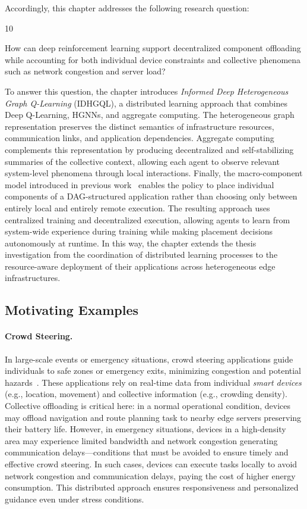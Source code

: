 Accordingly, this chapter addresses the following research question:

\begin{chapRQ}{10}
  \item
  How can deep reinforcement learning support decentralized component offloading while accounting
  for both individual device constraints and collective phenomena such as network congestion and server load?
  \label{idhgql-rq}
\end{chapRQ}

To answer this question, 
 the chapter introduces \emph{Informed Deep Heterogeneous Graph Q-Learning} (IDHGQL), 
 a distributed learning approach that combines Deep Q-Learning, \glspl{HGNN}, and aggregate computing.
%
The heterogeneous graph representation preserves the distinct semantics of infrastructure resources, 
 communication links, and application dependencies.
%
Aggregate computing complements this representation by producing decentralized and self-stabilizing summaries 
 of the collective context, allowing each agent to observe relevant system-level phenomena through local interactions.
%
Finally, 
 the macro-component model introduced in previous work~\cite{acsos-model} enables the policy to place individual components 
  of a DAG-structured application rather than choosing only between entirely local and entirely remote execution.
%
The resulting approach uses centralized training and decentralized execution, 
 allowing agents to learn from system-wide experience during training
 while making placement decisions autonomously at runtime.
%
In this way, 
 the chapter extends the thesis investigation from the coordination of distributed learning processes 
 to the resource-aware deployment of their applications across heterogeneous edge infrastructures.

\subsection{Motivating Examples}\label{subsec:offloading-motivating-examples}
\paragraph{Crowd Steering.}
In large-scale events or emergency situations, 
 crowd steering applications guide individuals to safe zones or emergency exits, 
 minimizing congestion and potential hazards~\cite{DBLP:conf/IEEEcit/SassiBGMMZ15}.
%
These applications rely on real-time data from individual \emph{smart devices} 
 (e.g., location, movement) and collective information (e.g., crowding density).
%
Collective offloading is critical here: in a normal operational condition,
 devices may offload navigation and route planning task to nearby edge servers preserving their battery life.
%
However, in emergency situations,
 devices in a high-density area 
 may experience limited bandwidth and network congestion generating communication delays---conditions 
 that must be avoided to ensure timely and effective crowd steering.
%
In such cases,
 devices can execute tasks locally to avoid network congestion and communication delays,
 paying the cost of higher energy consumption.
%
This distributed approach ensures responsiveness 
 and personalized guidance even under stress conditions.

